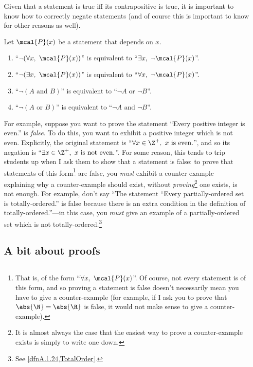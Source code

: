 Given that a statement is true iff its contrapositive is true, it is important to know how to correctly negate statements (and of course this is important to know for other reasons as well).
\begin{exm}{}{}
Let $\mcal{P}(x)$ be a statement that depends on $x$.
\begin{enumerate}
\item ``$\neg (\forall x,\ \mcal{P}(x))$'' is equivalent to ``$\exists x,\ \neg \mcal{P}(x)$''.
\item ``$\neg (\exists x,\ \mcal{P}(x))$'' is equivalent to ``$\forall x,\ \neg \mcal{P}(x)$''.
\item ``$\neg (A\text{ and }B)$'' is equivalent to ``$\neg A\text{ or }\neg B$''.
\item ``$\neg (A\text{ or }B)$'' is equivalent to ``$\neg A\text{ and }\neg B$''.
\end{enumerate}
\begin{rmk}
For example, suppose you want to prove the statement ``Every positive integer is even.'' is \emph{false}.  To do this, you want to exhibit a positive integer which is not even.  Explicitly, the original statement is ``$\forall x\in \Z ^+,\ x\text{ is even.}$'', and so its negation is ``$\exists x\in \Z ^+,\ x\text{ is not even.}$''.  For some reason, this tends to trip students up when I ask them to show that a statement is false:  to prove that statements of this form\footnote{That is, of the form ``$\forall x,\ \mcal{P}(x)$''.  Of course, not every statement is of this form, and so proving a statement is false doesn't necessarily mean you have to give a counter-example (for example, if I ask you to prove that $\abs{\N}=\abs{\R}$ is false, it would not make sense to give a counter-example).} are false, you \emph{must} exhibit a counter-example---explaining why a counter-example should exist, without \emph{proving}\footnote{It is almost always the case that the easiest way to prove a counter-example exists is simply to write one down.} one exists, is not enough.  For example, don't say ``The statement ``Every partially-ordered set is totally-ordered.'' is false because there is an extra condition in the definition of totally-ordered.''---in this case, you \emph{must} give an example of a partially-ordered set which is not totally-ordered.\footnote{See \cref{dfnA.1.24,TotalOrder}.}
\end{rmk}
\end{exm}

\subsection{A bit about proofs}\label{sbsABitAboutProofs}

